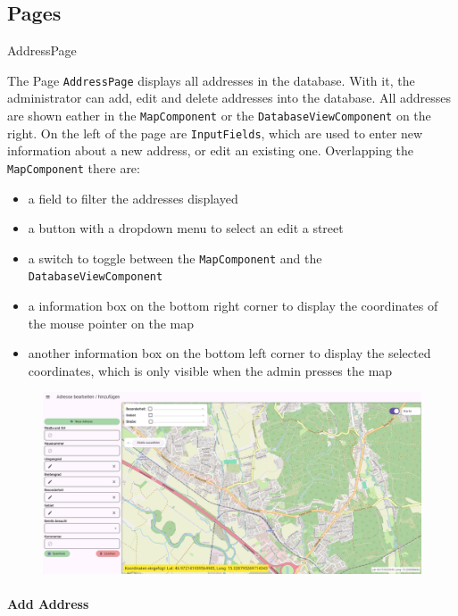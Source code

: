 \subsection{Pages}

\begin{subsubsection}{AddressPage}

The Page \texttt{AddressPage} displays all addresses in the database. With it, the administrator can add, edit and delete addresses into the database. All addresses are shown eather in the \texttt{MapComponent} or the \texttt{DatabaseViewComponent} on the right. On the left of the page are \texttt{InputFields}, which are used to enter new information about a new address, or edit an existing one. Overlapping the \texttt{MapComponent} there are:
\begin{itemize}
  \item a field to filter the addresses displayed
  \item a button with a dropdown menu to select an edit a street
  \item a switch to toggle between the \texttt{MapComponent} and the \texttt{DatabaseViewComponent}
  \item a information box on the bottom right corner to display the coordinates of the mouse pointer on the map
  \item another information box on the bottom left corner to display the selected coordinates, which is only visible when the admin presses the map
\end{itemize}

\begin{figure}[H]
    \centering
    \includegraphics[width=0.9\linewidth]{images/AdminPanel/AddressPage.png}
\end{figure}
\end{subsubsection}


\paragraph{Add Address}


